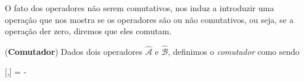     O fato dos operadores não serem comutativos, nos induz a introduzir uma operação que nos mostra se os operadores são ou não comutativos, ou seja, se a operação der zero, diremos que eles comutam.
    
    \begin{definition}\label{def: commutator}
        (\textbf{Comutador}) Dados dois operadores $\hat{\mathcal{A}}$ e $\hat{\mathcal{B}}$, definimos o \textit{comutador} como sendo
            \begin{answer}\label{eq: commutator}
                [,] =  - 
            \end{answer}
    \end{definition}